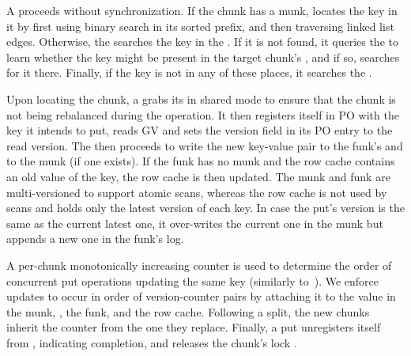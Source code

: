A  proceeds without synchronization. If the chunk has a munk,     locates the key in it by first using binary search in its sorted prefix, and then traversing linked list edges. 
Otherwise, the  searches the key in the . If it is not found, it queries 
the  to learn whether the key might be present in the target chunk's  
 , and if so, searches for it there.  Finally, if the key is not in any of these places, it searches
 the  .


Upon locating the chunk,  a  grabs its  in shared mode to ensure that the chunk is not being rebalanced during the  operation. It then registers itself in PO with the key it intends to put,
reads GV and sets the version field in its PO entry to the read version. 
The  then proceeds to write the new key-value pair to the  funk's  and to the 
munk (if one exists). 
If the funk has no munk and the row cache contains an old value of the key, the row cache is then updated.
The munk and funk are multi-versioned to support atomic scans, 
whereas the row cache is not used by scans and holds only the latest version of each key. 
In case the put's version is the same as the current latest one, it over-writes the current one in the munk
but appends a new one in the funk's log. 

A per-chunk monotonically increasing counter is used to determine 
the order of concurrent put operations updating the same key (similarly to~\cite{kiwi}).
We  enforce updates to occur in order of version-counter pairs by attaching it to the value in the munk, 
, the funk, and the row cache.
Following a split, the new chunks inherit the counter from the one they replace.  
Finally, a put unregisters itself from , indicating completion, 
and releases the chunk's lock .

